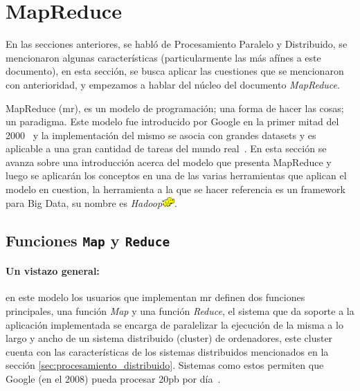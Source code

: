 \section{MapReduce}
\label{ssec:mapreduce}

En las secciones anteriores, se habló de Procesamiento Paralelo y Distribuido,
se mencionaron algunas características (particularmente las más afínes a este
documento), en esta sección, se busca aplicar las cuestiones que se mencionaron
con anterioridad, y empezamos a hablar del núcleo del documento
\textit{MapReduce}.

MapReduce (\acrshort{mr}), es un modelo de programación; una forma de hacer las cosas; un
paradigma. Este modelo fue introducido por Google en la primer mitad del
2000~\cite{dean2004} y la implementación del mismo se asocia con grandes 
\glspl{dataset} y es
aplicable a una gran cantidad de tareas del mundo real~\cite{dean2008}. En esta
sección se avanza sobre una introducción acerca del modelo que presenta
MapReduce y 
luego se aplicarán los conceptos en una de las varias herramientas que aplican
el modelo en cuestion, la herramienta a la que se hacer referencia es un 
\Gls{framework} para Big Data, su nombre es 
\textit{Hadoop}\includegraphics[height=10pt]{figuras/logos/hadoop_logo.png}.

\subsection{Funciones \texttt{Map} y \texttt{Reduce}}

\paragraph{Un vistazo general:}
en este modelo los usuarios que implementan \acrshort{mr} definen dos
funciones principales, una función \textit{Map} y una función \textit{Reduce},
el sistema que da soporte a la aplicación implementada se encarga de
paralelizar la ejecución de la misma a lo largo y ancho de un sistema
distribuido (\gls{cluster}) de ordenadores, este \gls{cluster} cuenta con las
características de los sistemas distribuidos mencionados en la sección
\ref{sec:procesamiento_distribuido}. Sistemas como estos permiten que Google
(en el 2008) pueda procesar 20\acrshort{pb} por día~\cite{dean2008}.



